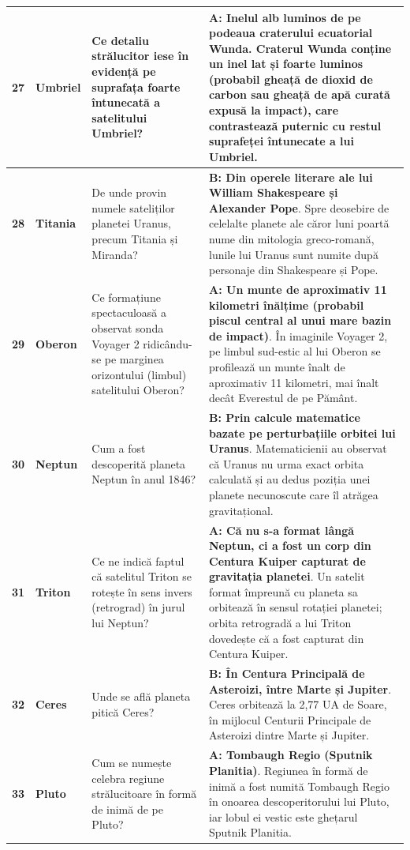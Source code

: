 \begin{longtable}{@{}r >{\raggedright\arraybackslash}p{2.7cm} >{\raggedright\arraybackslash}p{4.8cm} >{\raggedright\arraybackslash}p{6.5cm}@{}}
\textbf{27} & \textbf{Umbriel} & Ce detaliu strălucitor iese în evidență pe suprafața foarte întunecată a satelitului Umbriel? & \textbf{A: Inelul alb luminos de pe podeaua craterului ecuatorial Wunda}. {\footnotesize Craterul Wunda conține un inel lat și foarte luminos (probabil gheață de dioxid de carbon sau gheață de apă curată expusă la impact), care contrastează puternic cu restul suprafeței întunecate a lui Umbriel.} \\ \midrule
\textbf{28} & \textbf{Titania} & De unde provin numele sateliților planetei Uranus, precum Titania și Miranda? & \textbf{B: Din operele literare ale lui William Shakespeare și Alexander Pope}. {\footnotesize Spre deosebire de celelalte planete ale căror luni poartă nume din mitologia greco-romană, lunile lui Uranus sunt numite după personaje din Shakespeare și Pope.} \\ \midrule
\textbf{29} & \textbf{Oberon} & Ce formațiune spectaculoasă a observat sonda Voyager 2 ridicându-se pe marginea orizontului (limbul) satelitului Oberon? & \textbf{A: Un munte de aproximativ 11 kilometri înălțime (probabil piscul central al unui mare bazin de impact)}. {\footnotesize În imaginile Voyager 2, pe limbul sud-estic al lui Oberon se profilează un munte înalt de aproximativ 11 kilometri, mai înalt decât Everestul de pe Pământ.} \\ \midrule
\textbf{30} & \textbf{Neptun} & Cum a fost descoperită planeta Neptun în anul 1846? & \textbf{B: Prin calcule matematice bazate pe perturbațiile orbitei lui Uranus}. {\footnotesize Matematicienii au observat că Uranus nu urma exact orbita calculată și au dedus poziția unei planete necunoscute care îl atrăgea gravitațional.} \\ \midrule
\textbf{31} & \textbf{Triton} & Ce ne indică faptul că satelitul Triton se rotește în sens invers (retrograd) în jurul lui Neptun? & \textbf{A: Că nu s-a format lângă Neptun, ci a fost un corp din Centura Kuiper capturat de gravitația planetei}. {\footnotesize Un satelit format împreună cu planeta sa orbitează în sensul rotației planetei; orbita retrogradă a lui Triton dovedește că a fost capturat din Centura Kuiper.} \\ \midrule
\textbf{32} & \textbf{Ceres} & Unde se află planeta pitică Ceres? & \textbf{B: În Centura Principală de Asteroizi, între Marte și Jupiter}. {\footnotesize Ceres orbitează la 2,77 UA de Soare, în mijlocul Centurii Principale de Asteroizi dintre Marte și Jupiter.} \\ \midrule
\textbf{33} & \textbf{Pluto} & Cum se numește celebra regiune strălucitoare în formă de inimă de pe Pluto? & \textbf{A: Tombaugh Regio (Sputnik Planitia)}. {\footnotesize Regiunea în formă de inimă a fost numită Tombaugh Regio în onoarea descoperitorului lui Pluto, iar lobul ei vestic este ghețarul Sputnik Planitia.} \\ \midrule

\end{longtable}
